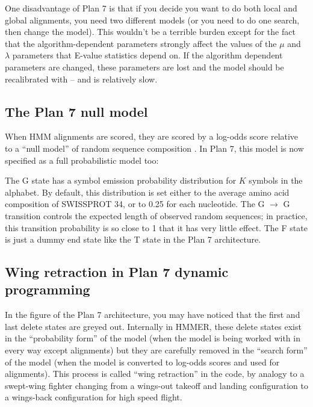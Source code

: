 One disadvantage of Plan 7 is that if you decide you want to do both
local and global alignments, you need two different models (or you
need to do one search, then change the model). This wouldn't be a
terrible burden except for the fact that the algorithm-dependent
parameters strongly affect the values of the $\mu$ and $\lambda$
parameters that E-value statistics depend on. If the algorithm
dependent parameters are changed, these parameters are lost and the
model should be recalibrated with  -- and
 is relatively slow.


\subsection{The Plan 7 null model}

When HMM alignments are scored, they are scored by a log-odds score
relative to a ``null model'' of random sequence composition
\cite{Barrett97}. In Plan 7, this model is now specified as a full
probabilistic model too:

\begin{center}
\end{center}

The G state has a symbol emission probability distribution for $K$
symbols in the alphabet. By default, this distribution is set either
to the average amino acid composition of SWISSPROT 34, or to 0.25 for
each nucleotide. The G $\rightarrow$ G transition controls the
expected length of observed random sequences; in practice, this
transition probability is so close to 1 that it has very little
effect. The F state is just a dummy end state like the T state in the
Plan 7 architecture.

\subsection{Wing retraction in Plan 7 dynamic programming}

In the figure of the Plan 7 architecture, you may have noticed that
the first and last delete states are greyed out. Internally in HMMER,
these delete states exist in the ``probability form'' of the model
(when the model is being worked with in every way except alignments)
but they are carefully removed in the ``search form'' of the model
(when the model is converted to log-odds scores and used for
alignments). This process is called ``wing retraction'' in the code,
by analogy to a swept-wing fighter changing from a wings-out takeoff
and landing configuration to a wings-back configuration for high speed
flight.

